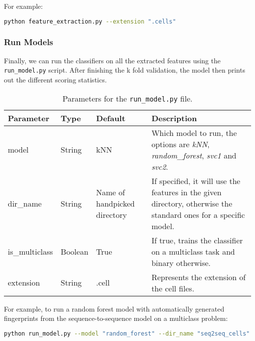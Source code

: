 \noindent
For example:
\begin{lstlisting}[language=Bash]
python feature_extraction.py --extension ".cells"
\end{lstlisting}

\newpage

\subsubsection{Run Models}

Finally, we can run the classifiers on all the extracted features using the \texttt{run\_model.py} script.
After finishing the k fold validation, the model then prints out the different scoring statistics.

\begin{table}[ht]
  \centering
  \begin{tabular}{ l | l | l | p{} }
    \textbf{Parameter} & \textbf{Type} & \textbf{Default} & \textbf{Description} \\ \hline \hline
    model & String & kNN & Which model to run, the options are \textit{kNN}, \textit{random\_forest}, \textit{svc1} and \textit{svc2}. \\ \hline
    dir\_name & String & Name of handpicked directory & If specified, it will use the features in the given directory, otherwise the standard ones for a specific model. \\ \hline
    is\_multiclass & Boolean & True & If true, trains the classifier on a multiclass task and binary otherwise. \\ \hline
    extension & String & .cell & Represents the extension of the cell files.
  \end{tabular}
  \caption{Parameters for the \texttt{run\_model.py} file.}
\end{table}

\noindent
For example, to run a random forest model with automatically generated fingerprints from the sequence-to-sequence model on a multiclass problem:
\begin{lstlisting}[language=Bash]
python run_model.py --model "random_forest" --dir_name "seq2seq_cells"
\end{lstlisting}

\endgroup
